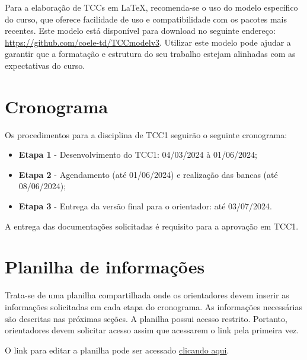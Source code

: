 \documentclass[a4paper, 12pt]{article}
\newcommand{\startdate}{04/03/2024}		%
\newcommand{\agendadate}{01/06/2024}	%
\newcommand{\bancadate}{08/06/2024}		%
\newcommand{\finaldate}{03/07/2024}		%
\begin{document}
	Para a elaboração de TCCs em \LaTeX{}, recomenda-se o uso do modelo específico do curso, que oferece facilidade de uso e compatibilidade com os pacotes mais recentes. Este modelo está disponível para download no seguinte endereço: \url{https://github.com/coele-td/TCCmodelv3}. Utilizar este modelo pode ajudar a garantir que a formatação e estrutura do seu trabalho estejam alinhadas com as expectativas do curso.


    \section{Cronograma}
    \label{sec:CRO}
    
    Os procedimentos para a disciplina de TCC1 seguirão o seguinte cronograma:
    \begin{itemize}
    	\item \textbf{Etapa 1} - Desenvolvimento do TCC1: \startdate{} à \agendadate;
    	\item \textbf{Etapa 2} - Agendamento (até \agendadate) e realização das bancas (até \bancadate);
    	\item \textbf{Etapa 3} - Entrega da versão final para o orientador: até \finaldate.    	
    \end{itemize}

	A entrega das documentações solicitadas é requisito para a aprovação em TCC1.

	\section{Planilha de informações}
	\label{sec:pla}
	
	Trata-se de uma planilha compartilhada onde os orientadores  devem inserir as informações solicitadas em cada etapa do cronograma. As informações necessárias são descritas nas próximas seções. A planilha possui acesso restrito. Portanto, orientadores devem solicitar acesso assim que acessarem o link pela primeira vez.

	
	O link para editar a planilha pode ser acessado \href{https://docs.google.com/spreadsheets/d/1AfsG1P6wrw42CbZCDbQzsXFXmxfrMmZ7gpn8NvR8cq4/edit?usp=sharing}{clicando aqui}.
	
\end{document}
